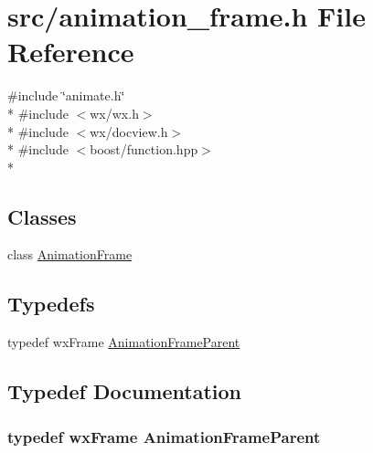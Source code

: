\hypertarget{a00171}{\section{src/animation\-\_\-frame.h File Reference}
\label{a00171}
}
{\ttfamily \#include \char`\"{}animate.\-h\char`\"{}}\\*
{\ttfamily \#include $<$wx/wx.\-h$>$}\\*
{\ttfamily \#include $<$wx/docview.\-h$>$}\\*
{\ttfamily \#include $<$boost/function.\-hpp$>$}\\*
\subsection*{Classes}
\begin{DoxyCompactItemize}
\item 
class \hyperlink{a00012}{Animation\-Frame}
\end{DoxyCompactItemize}
\subsection*{Typedefs}
\begin{DoxyCompactItemize}
\item 
typedef wx\-Frame \hyperlink{a00171_a8b295c639a8d2391dc4584107c78db16}{Animation\-Frame\-Parent}
\end{DoxyCompactItemize}


\subsection{Typedef Documentation}
\hypertarget{a00171_a8b295c639a8d2391dc4584107c78db16}{
\subsubsection[{Animation\-Frame\-Parent}]{\setlength{\rightskip}{0pt plus 5cm}typedef wx\-Frame {\bf Animation\-Frame\-Parent}}}\label{a00171_a8b295c639a8d2391dc4584107c78db16}
